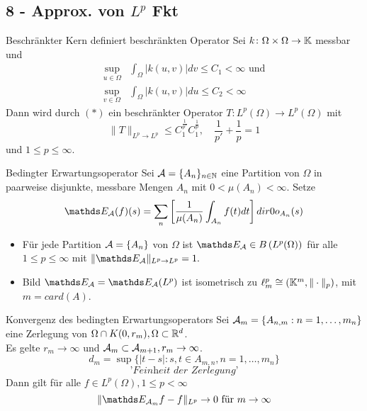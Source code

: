 \subsection*{8 - Approx. von $L^{p}$ Fkt}

	\begin{karte}{Beschränkter Kern definiert beschränkten Operator}
		Sei $k \colon \Omega \times \Omega \rightarrow \mathbb{K}$ messbar	und
		\begin{align*}
			\sup_{u \in \Omega} & \int_{\Omega} |k(u, v)| dv \leq C_{1} < \infty \text{ und} \\
			\sup_{v \in \Omega} & \int_{\Omega} |k(u, v)| du \leq C_{2} < \infty
		\end{align*}
		Dann wird durch \hyperref[eq:8.0-BeschrOperatorInLp]{$(*)$} ein beschränkter Operator $T \colon L^{p}(\Omega) \rightarrow L^{p}(\Omega)$ mit
		\[ \| T \|_{L^{p} \rightarrow L^{p}} \leq C_{1}^{\frac{1}{p'}} C_{1}^{\frac{1}{p}}, \quad \frac{1}{p'} + \frac{1}{p} = 1   \]
		und $1 \leq p \leq \infty$.		
	\end{karte}
	
	\begin{karte}{Bedingter Erwartungsoperator} 
	Sei $\mathcal{A} = \{ A_{n} \}_{n \in \mathbb{N}}$ eine Partition von $\Omega$ in paarweise disjunkte, messbare Mengen $A_{n}$ mit $0 < \mu(A_{n}) < \infty$. Setze
	\[ \EW_{\ca}(f)(s) = \sum_{n} \left[ \frac{1}{\mu(A_{n})} \int_{A_{n}} f(t) dt \right] \1_{A_{n}}(s) \] 
		\begin{itemize}
			\item Für jede Partition $\mathcal{A} = \{ A_{n} \}$ von $\Omega$ ist $\EW_{\ca} \in B \left( L^{p}(\Omega) \right)$ für alle $1 \leq p \leq \infty$ mit $\| \EW_{\ca} \|_{L^{p} \rightarrow L^{p}} = 1.$
			\item Bild $\EW_{\ca} = \EW_{\ca}(L^{p})$ ist isometrisch zu $\ell^{p}_{m} \cong \left( \mathbb{K}^{m}, \| \cdot \|_{p} \right)$, mit $m = card(A)$. 
		\end{itemize}
	\end{karte}
	
	\begin{karte}{Konvergenz des bedingten Erwartungsoperators}
		Sei $\mathcal{A}_{m} = \{ A_{n, m} : n = 1, \dotsc, m_{n} \}$ eine Zerlegung von $ \Omega \cap K(0, r_{m}), \Omega \subset \mathbb{R}^{d}$. \\
		Es gelte $r_{m} \rightarrow \infty$ und $\mathcal{A}_{m} \subset \mathcal{A}_{m + 1}, r_{m} \rightarrow \infty$.
		\[ d_{m} = \sup \{ |t - s|: s, t \in A_{m, n}, n = 1, \dotsc, m_{n} \} \] \[ \textit{'Feinheit der Zerlegung'} \]
		Dann gilt für alle $f \in L^{p}(\Omega), 1 \leq p < \infty$
		\[ \| \EW_{\ca_{m}} f - f \|_{L^{p}} \rightarrow 0 \text{ für } m \rightarrow \infty \]	
	\end{karte}
	
